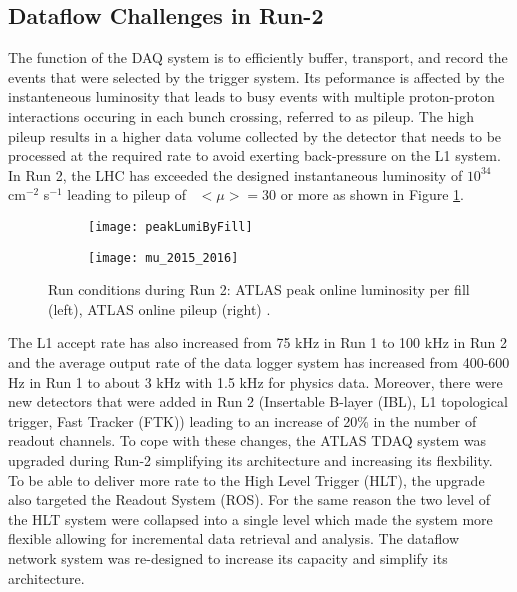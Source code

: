 \subsection{Dataflow Challenges in Run-2}
The function of the DAQ system is to efficiently buffer, transport, and record the events that were selected by the trigger system. 
Its peformance is affected by the instanteneous luminosity that leads to busy events with multiple proton-proton interactions occuring in each 
bunch crossing, referred to as pileup. The high pileup results in a higher data volume collected by the detector that needs to be 
processed at the required rate to avoid exerting back-pressure on the L1 system. 
In Run 2, the LHC has exceeded the designed instantaneous luminosity of $10^{34}$ cm$^{-2}$ s$^{-1}$ leading to pileup of~ $<\mu>=30$ or more as shown 
in Figure \ref{fig:lumi_pileup_1}.
\begin{figure}[t!]
\centering
\begin{subfigure}[t]{0.48\textwidth}
\texttt{[image: peakLumiByFill]}
\end{subfigure}
\begin{subfigure}[t]{0.48\textwidth}
\texttt{[image: mu\_2015\_2016]}
\end{subfigure}
\caption{Run conditions during Run 2: ATLAS peak online luminosity per fill (left), ATLAS online pileup (right) \cite{atlasTwiki}.}
\label{fig:lumi_pileup_1}
\end{figure} 
The L1 accept 
rate has also increased from 75 kHz in Run 1 to 100 kHz in Run 2 and the average output rate of the data logger system has 
increased from 400-600 Hz in Run 1 to about 3 kHz with 1.5 kHz for physics data. 
Moreover, there were new detectors that were added in Run 2
(Insertable B-layer (IBL), L1 topological trigger, Fast Tracker (FTK))\cite{Aad:1602235} leading to 
an increase of 20\% in the number of readout channels. 
To cope with these changes, the ATLAS TDAQ system was upgraded during Run-2
simplifying its architecture and increasing its flexbility.
To be able to deliver more rate to the High Level Trigger (HLT), the upgrade also targeted the Readout System (ROS)\cite{PanduroVazquez2016939}. 
For the same reason the two level of the HLT system were collapsed into a single level which made the system more flexible 
 allowing for incremental data retrieval and analysis. 
The dataflow network system was re-designed to increase its capacity and simplify its architecture\cite{1742-6596-396-1-012033}.

